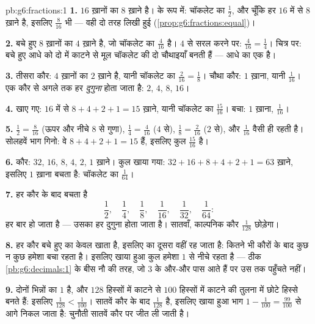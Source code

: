 \begin{solution}{pb:g6:fractions:1}
\textbf{1.} $16$ ख़ानों का  $8$ ख़ाने है।  के रूप में:
चॉकलेट का $\frac12$, और चूँकि हर  $16$ में से $8$ ख़ाने है,
इसलिए $\frac{8}{16}$ भी --- वही  दो तरह लिखी हुई
(\cref{prop:g6:fractions:equal})।

\textbf{2.} बचे हुए $8$ ख़ानों का  $4$ ख़ाने है, जो चॉकलेट का
$\frac{4}{16}$ है। $4$ से सरल करने पर:
$\frac{4}{16} = \frac14$। चित्र पर: बचे हुए आधे को दो में काटने
से मूल चॉकलेट की दो चौथाइयाँ बनती हैं --- आधे का  एक
 है।

\textbf{3.} तीसरा कौर: $4$ ख़ानों का  $2$ ख़ाने है, यानी
चॉकलेट का $\frac{2}{16} = \frac18$। चौथा कौर: $1$ ख़ाना,
यानी $\frac{1}{16}$। एक कौर से अगले तक हर
\emph{दुगुना} होता जाता है: $2$, $4$, $8$, $16$।

\textbf{4.} खाए गए: $16$ में से $8 + 4 + 2 + 1 = 15$ ख़ाने, यानी
चॉकलेट का $\frac{15}{16}$। बचा: $1$ ख़ाना, $\frac{1}{16}$।

\textbf{5.} $\frac12 = \frac{8}{16}$ (ऊपर और नीचे $8$ से गुणा),
$\frac14 = \frac{4}{16}$ ($4$ से), $\frac18 = \frac{2}{16}$
($2$ से), और $\frac{1}{16}$ वैसी ही रहती है। सोलहवें भाग गिनो:
वे $8 + 4 + 2 + 1 = 15$ हैं, इसलिए कुल $\frac{15}{16}$ है।

\textbf{6.} कौर: $32$, $16$, $8$, $4$, $2$, $1$ ख़ाने। कुल खाया
गया: $32 + 16 + 8 + 4 + 2 + 1 = 63$ ख़ाने, इसलिए $1$ ख़ाना
बचता है: चॉकलेट का $\frac{1}{64}$।

\textbf{7.} हर कौर के बाद बचता है
\[
\frac12,\quad \frac14,\quad \frac18,\quad \frac{1}{16},\quad
\frac{1}{32},\quad \frac{1}{64} :
\]
 हर बार  हो जाता है --- उसका हर दुगुना होता जाता है।
सातवाँ, काल्पनिक कौर $\frac{1}{128}$ छोड़ेगा।

\textbf{8.} हर कौर बचे हुए का केवल \emph{} खाता है, इसलिए
 का दूसरा  वहीं रह जाता है: कितने भी कौरों के बाद कुछ न
कुछ हमेशा बचा रहता है। इसलिए खाया हुआ कुल हमेशा $1$ से नीचे रहता
है --- ठीक \cref{pb:g6:decimals:1} के बीस नौ की तरह, जो $3$ के
और-और पास आते हैं पर उस तक पहुँचते नहीं।

\textbf{9.} दोनों भिन्नों का  $1$ है, और $128$ हिस्सों में
काटने से $100$ हिस्सों में काटने की तुलना में छोटे हिस्से बनते
हैं: इसलिए $\frac{1}{128} < \frac{1}{100}$। सातवें कौर के बाद
 $\frac{1}{128}$ है, इसलिए खाया हुआ भाग
$1 - \frac{1}{100} = \frac{99}{100}$ से आगे निकल जाता है:
चुनौती सातवें कौर पर जीत ली जाती है।


\end{solution}
